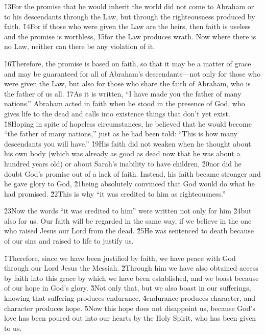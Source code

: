\v{13}For the promise that he would inherit the world did not come to Abraham or to his descendants through the Law, but through the righteousness produced by faith. \v{14}For if those who were given the Law are the heirs, then faith is useless and the promise is worthless, \v{15}for the Law produces wrath. Now where there is no Law, neither can there be any violation of it.

\v{16}Therefore, the promise is based on faith, so that it may be a matter of grace and may be guaranteed for all of Abraham's descendants---not only for those who were given the Law, but also for those who share the faith of Abraham, who is the father of us all. \v{17}As it is written, ``I have made you the father of many nations.'' Abraham acted in faith when he stood in the presence of God, who gives life to the dead and calls into existence things that don't yet exist. \v{18}Hoping in spite of hopeless circumstances, he believed that he would become ``the father of many nations,'' just as he had been told: ``This is how many descendants you will have.'' \v{19}His faith did not weaken when he thought about his own body (which was already as good as dead now that he was about a hundred years old) or about Sarah's inability to have children, \v{20}nor did he doubt God's promise out of a lack of faith. Instead, his faith became stronger and he gave glory to God, \v{21}being absolutely convinced that God would do what he had promised. \v{22}This is why ``it was credited to him as righteousness.''

\v{23}Now the words ``it was credited to him'' were written not only for him \v{24}but also for us. Our faith will be regarded in the same way, if we believe in the one who raised Jesus our Lord from the dead. \v{25}He was sentenced to death because of our sins and raised to life to justify us.

\v{1}Therefore, since we have been justified by faith, we have peace with God through our Lord Jesus the Messiah. \v{2}Through him we have also obtained access by faith into this grace by which we have been established, and we boast because of our hope in God's glory. \v{3}Not only that, but we also boast in our sufferings, knowing that suffering produces endurance, \v{4}endurance produces character, and character produces hope. \v{5}Now this hope does not disappoint us, because God's love has been poured out into our hearts by the Holy Spirit, who has been given to us.

